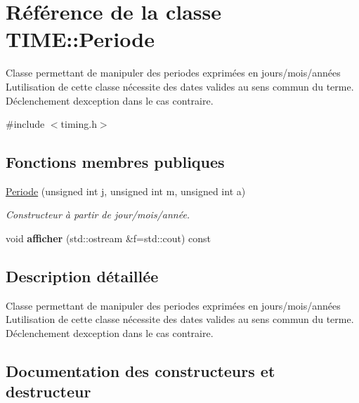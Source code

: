 \hypertarget{class_t_i_m_e_1_1_periode}{}\section{Référence de la classe T\+I\+M\+E\+:\+:Periode}
\label{class_t_i_m_e_1_1_periode}


Classe permettant de manipuler des periodes exprimées en jours/mois/années L\textquotesingle{}utilisation de cette classe nécessite des dates valides au sens commun du terme. Déclenchement d\textquotesingle{}exception dans le cas contraire.  




{\ttfamily \#include $<$timing.\+h$>$}

\subsection*{Fonctions membres publiques}
\begin{DoxyCompactItemize}
\item 
\hyperlink{class_t_i_m_e_1_1_periode_ab5de9657ef88d74ca2cdc4a49b963ba6}{Periode} (unsigned int j, unsigned int m, unsigned int a)
\begin{DoxyCompactList}\small\item\em Constructeur à partir de jour/mois/année. \end{DoxyCompactList}\item 
\hypertarget{class_t_i_m_e_1_1_periode_a0e97a115f8a2e6b503fdcb82ee1d8f08}{}void {\bfseries afficher} (std\+::ostream \&f=std\+::cout) const \label{class_t_i_m_e_1_1_periode_a0e97a115f8a2e6b503fdcb82ee1d8f08}

\end{DoxyCompactItemize}


\subsection{Description détaillée}
Classe permettant de manipuler des periodes exprimées en jours/mois/années L\textquotesingle{}utilisation de cette classe nécessite des dates valides au sens commun du terme. Déclenchement d\textquotesingle{}exception dans le cas contraire. 

\subsection{Documentation des constructeurs et destructeur}
\hypertarget{class_t_i_m_e_1_1_periode_ab5de9657ef88d74ca2cdc4a49b963ba6}{}

